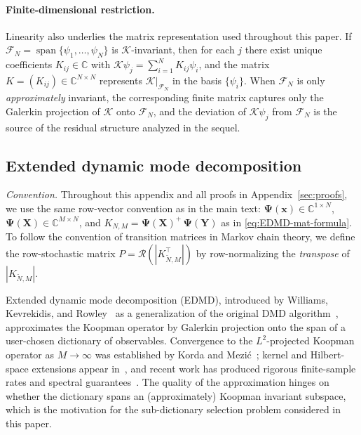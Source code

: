 \documentclass{article}
\theoremstyle{plain}
\theoremstyle{definition}
\DeclareMathOperator{\Span}{span}
\def\tp{\intercal}
\def\X{\mathbf{X}}
\def\x{\mathbf{x}}
\def\Y{\mathbf{Y}}
\def\Koop{\mathcal{K}}
\def\Fc{\mathcal{F}}
\newcommand{\arXivtag}[1][]{#1}
\begin{document}
\paragraph{Finite-dimensional restriction.}
Linearity also underlies the matrix representation used throughout this paper. If $\Fc_N=\Span\{\psi_1,\ldots,\psi_N\}$ is $\Koop$-invariant, then for each $j$ there exist unique coefficients $K_{ij}\in\mathbb{C}$ with $\Koop\psi_j=\sum_{i=1}^N K_{ij}\psi_i$, and the matrix $K=(K_{ij})\in\mathbb{C}^{N\times N}$ represents $\Koop|_{\Fc_N}$ in the basis $\{\psi_i\}$. When $\Fc_N$ is only \emph{approximately} invariant, the corresponding finite matrix captures only the Galerkin projection of $\Koop$ onto $\Fc_N$, and the deviation of $\Koop\psi_j$ from $\Fc_N$ is the source of the residual structure analyzed in the sequel.

\subsection{Extended dynamic mode decomposition}\label{sec:app-edmd}

\emph{Convention.} Throughout this appendix and all proofs in Appendix~\ref{sec:proofs}, we use the same row-vector convention as in the main text: $\mathbf{\Psi}(\x) \in \mathbb{C}^{1\times N}$, $\mathbf{\Psi}(\X) \in \mathbb{C}^{M\times N}$, and $K_{N,M} = \mathbf{\Psi}(\X)^{+}\,\mathbf{\Psi}(\Y)$ as in \eqref{eq:EDMD-mat-formula}. \arXivtag[To follow the convention of transition matrices in Markov chain theory, we define the row-stochastic matrix $P = \mathcal{R}(|K_{\tilde N,M}^{\tp}|)$] by row-normalizing the \emph{transpose} of $|K_{\tilde N,M}|$.

Extended dynamic mode decomposition (EDMD), introduced by Williams, Kevrekidis, and Rowley~\cite{williams2015data} as a generalization of the original DMD algorithm~\cite{schmid2010dynamic,rowley2009spectral}, approximates the Koopman operator by Galerkin projection onto the span of a user-chosen dictionary of observables. Convergence to the $L^2$-projected Koopman operator as $M \to \infty$ was established by Korda and Mezi\'c~\cite{korda2018convergence}; kernel and Hilbert-space extensions appear in~\cite{kevrekidis2016kernel,Klus2016JCompDyn}, and recent work has produced rigorous finite-sample rates and spectral guarantees~\cite{zhang2023quantitative,nuske2023finite,colbrook2024rigorous,Kostic-NeuRips2023}. The quality of the approximation hinges on whether the dictionary spans an (approximately) Koopman invariant subspace\arXivtag[,] which is the motivation for the sub-dictionary selection problem considered in this paper.
\end{document}
